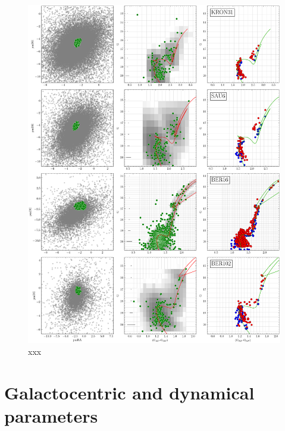 \documentclass[referee]{aa}
\begin{document}
\begin{appendix}
 \begin{figure}
  \centering
  \includegraphics[height=.95\textheight]{figs/20_fpars.png}
  \caption{xxx}
  \label{fig:20fpars}
 \end{figure}



\section{Galactocentric and dynamical parameters}
\label{app:galac_dynam}


\end{appendix}
\end{document}
